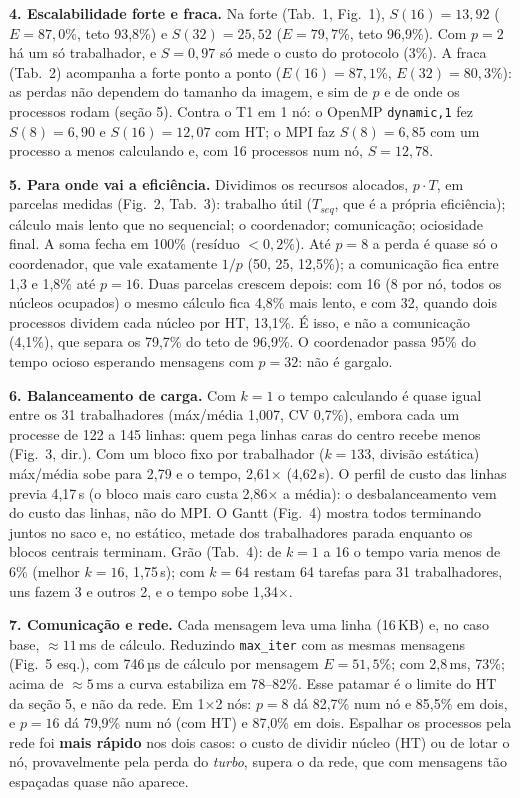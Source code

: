 \documentclass[10pt,a4paper,twocolumn]{article}
\begin{document}
\textbf{4. Escalabilidade forte e fraca.}
Na forte (Tab.~1, Fig.~1), $S(16)=13{,}92$ ($E=87{,}0\%$, teto 93,8\%) e
$S(32)=25{,}52$ ($E=79{,}7\%$, teto 96,9\%). Com $p=2$ há um só trabalhador,
e $S=0{,}97$ só mede o custo do protocolo (3\%). A fraca (Tab.~2) acompanha a
forte ponto a ponto ($E(16)=87{,}1\%$, $E(32)=80{,}3\%$): as perdas não
dependem do tamanho da imagem, e sim de $p$ e de onde os processos rodam
(seção 5). Contra o T1 em 1 nó: o OpenMP \texttt{dynamic,1} fez
$S(8)=6{,}90$ e $S(16)=12{,}07$ com HT; o MPI faz $S(8)=6{,}85$ com um
processo a menos calculando e, com 16 processos num nó, $S=12{,}78$.

\textbf{5. Para onde vai a eficiência.}
Dividimos os recursos alocados, $p\cdot T$, em parcelas medidas (Fig.~2,
Tab.~3): trabalho útil ($T_{seq}$, que é a própria eficiência); cálculo mais
lento que no sequencial; o coordenador; comunicação; ociosidade final. A soma
fecha em 100\% (resíduo $<0{,}2\%$).
Até $p=8$ a perda é quase só o coordenador, que vale exatamente $1/p$
(50, 25, 12,5\%); a comunicação fica entre 1,3 e 1,8\% até $p=16$. Duas
parcelas crescem depois: com 16 (8 por nó, todos os núcleos ocupados) o mesmo
cálculo fica 4,8\% mais lento, e com 32, quando dois processos dividem cada
núcleo por HT, 13,1\%. É isso, e não a comunicação (4,1\%), que separa os
79,7\% do teto de 96,9\%. O coordenador passa 95\% do tempo ocioso esperando
mensagens com $p=32$: não é gargalo.

\textbf{6. Balanceamento de carga.}
Com $k=1$ o tempo calculando é quase igual entre os 31 trabalhadores
(máx/média 1,007, CV 0,7\%), embora cada um processe de 122 a 145 linhas:
quem pega linhas caras do centro recebe menos (Fig.~3, dir.). Com um bloco
fixo por trabalhador ($k=133$, divisão estática) máx/média sobe para 2,79 e
o tempo, 2,61$\times$ (4,62\,s). O perfil de custo das linhas previa
4,17\,s (o bloco mais caro custa 2,86$\times$ a média): o desbalanceamento
vem do custo das linhas, não do MPI. O Gantt (Fig.~4) mostra todos terminando
juntos no saco e, no estático, metade dos trabalhadores parada enquanto os
blocos centrais terminam. Grão (Tab.~4): de $k=1$ a 16 o tempo varia menos de
6\% (melhor $k=16$, 1,75\,s); com $k=64$ restam 64 tarefas para 31
trabalhadores, uns fazem 3 e outros 2, e o tempo sobe 1,34$\times$.

\textbf{7. Comunicação e rede.}
Cada mensagem leva uma linha (16\,KB) e, no caso base, ${\approx}11$\,ms de
cálculo. Reduzindo \texttt{max\_iter} com as mesmas mensagens (Fig.~5 esq.),
com 746\,µs de cálculo por mensagem $E=51{,}5\%$; com 2,8\,ms, 73\%; acima de
${\approx}5$\,ms a curva estabiliza em 78--82\%. Esse patamar é o limite do
HT da seção 5, e não da rede. Em 1×2 nós: $p=8$ dá 82,7\% num nó e 85,5\% em
dois, e $p=16$ dá 79,9\% num nó (com HT) e 87,0\% em dois. Espalhar os
processos pela rede foi \textbf{mais rápido} nos dois casos: o custo de
dividir núcleo (HT) ou de lotar o nó, provavelmente pela perda do
\emph{turbo}, supera o da rede, que com mensagens tão espaçadas quase não
aparece.
\end{document}

